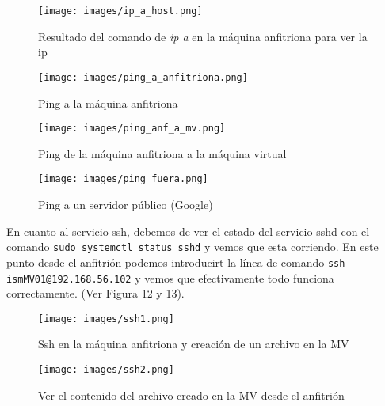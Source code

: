 \documentclass[a4paper,12pt]{article}
\begin{document}
\begin{figure}[htbp]
    \centering
    \begin{minipage}[b]{0.45\textwidth}
        \centering
        \texttt{[image: images/ip\_a\_host.png]}
        \caption{Resultado del comando de \textit{ip a } en la máquina anfitriona para ver la ip}
        \label{fig:ejercicio1}
    \end{minipage}
    \hfill
    \begin{minipage}[b]{0.45\textwidth}
        \centering
        \texttt{[image: images/ping\_a\_anfitriona.png]}
        \caption{Ping a la máquina anfitriona}
        \label{fig:ejercicio1_vbox}
    \end{minipage}
\end{figure}


\begin{figure}[htbp]
    \centering
    \begin{minipage}[b]{0.45\textwidth}
        \centering
        \texttt{[image: images/ping\_anf\_a\_mv.png]}
        \caption{Ping de la máquina anfitriona a la máquina virtual}
        \label{fig:ejercicio1}
    \end{minipage}
    \hfill
    \begin{minipage}[b]{0.45\textwidth}
        \centering
        \texttt{[image: images/ping\_fuera.png]}
        \caption{Ping a un servidor público (Google)}
        \label{fig:ejercicio1_vbox}
    \end{minipage}
\end{figure}


En cuanto al servicio ssh, debemos de ver el estado del servicio sshd con el comando \texttt{sudo systemctl status sshd} y vemos que esta corriendo. En este punto desde el anfitrión podemos introducirt la línea de comando \texttt{ssh ismMV01@192.168.56.102} y vemos que efectivamente todo funciona correctamente. (Ver Figura 12 y 13).






\begin{figure}[htbp]
    \centering
    \begin{minipage}[b]{0.45\textwidth}
        \centering
        \texttt{[image: images/ssh1.png]}
        \caption{Ssh en la máquina anfitriona y creación de un archivo en la MV}
        \label{fig:ejercicio1}
    \end{minipage}
    \hfill
    \begin{minipage}[b]{0.45\textwidth}
        \centering
        \texttt{[image: images/ssh2.png]}
        \caption{Ver el contenido del archivo creado en la MV desde el anfitrión}
        \label{fig:ejercicio1_vbox}
    \end{minipage}
\end{figure}
\end{document}
